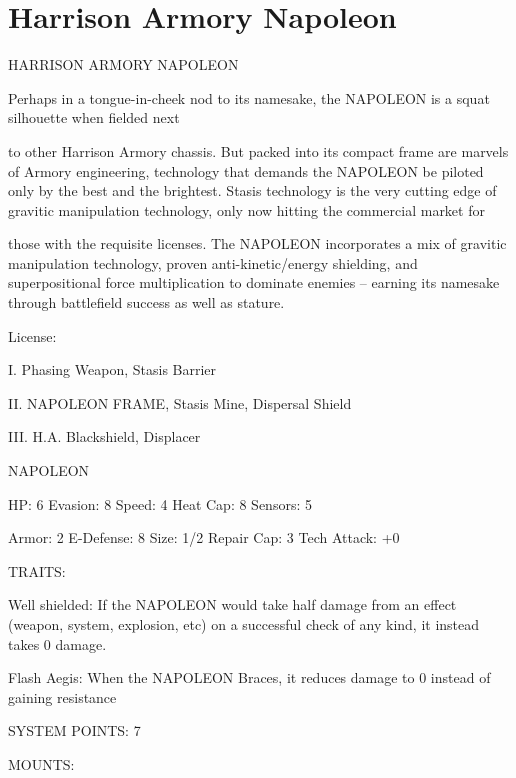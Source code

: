 \section{Harrison Armory Napoleon}


                             HARRISON ARMORY NAPOLEON  

Perhaps in a tongue-in-cheek nod to its namesake, the NAPOLEON is a squat silhouette when fielded next  

to other Harrison Armory chassis. But packed into its compact frame are marvels of Armory engineering,  
technology that demands the NAPOLEON be piloted only by the best and the brightest. Stasis technology  
is the very cutting edge of gravitic manipulation technology, only now hitting the commercial market for  

those with the requisite licenses. The NAPOLEON incorporates a mix of gravitic manipulation technology,  
proven anti-kinetic/energy shielding, and superpositional force multiplication to dominate enemies --  
earning its namesake through battlefield success as well as stature.    

                                                  License:
 
I. Phasing Weapon, Stasis Barrier
 
II. NAPOLEON FRAME, Stasis Mine, Dispersal Shield
 
III. H.A. Blackshield, Displacer
 

                                               NAPOLEON 

 HP: 6          Evasion: 8                           Speed: 4           Heat Cap: 8       Sensors:  5 

 Armor: 2       E-Defense: 8                         Size: 1/2          Repair Cap: 3     Tech Attack:  
                                                                                          +0 

                                                  TRAITS: 

 Well shielded: If the NAPOLEON would take half damage from an effect (weapon, system, explosion,  
 etc) on a successful check of any kind, it instead takes 0 damage.
 
 Flash Aegis: When the NAPOLEON Braces, it reduces damage to 0 instead of gaining resistance 

                                            SYSTEM POINTS: 7 

                                                 MOUNTS: 

